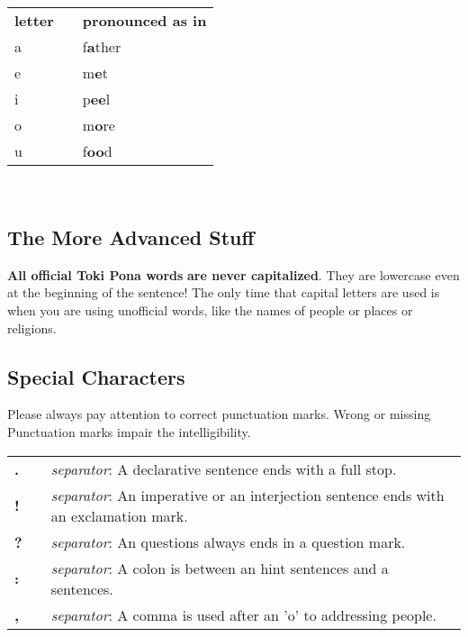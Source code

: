 \begin{supertabular}{p{2,5cm}|ll}
\textbf{letter}   &&    \textbf{pronounced as in} \\ %
a   &&    f\textbf{a}ther \\ %
e   &&    m\textbf{e}t \\ %
i   &&    p\textbf{ee}l \\ %
o   &&    m\textbf{o}re \\ %
u   &&    f\textbf{oo}d \\ %
\end{supertabular} \\
%
\subsection*{The More Advanced Stuff}
%
\textbf{All official Toki Pona words} 
\textbf{are never capitalized}. They are lowercase even at the beginning of the sentence! 
The only time that capital letters are used is when you are using unofficial words, like the names of people or places or religions. 
%
%
\subsection*{Special Characters}
%
Please always pay attention to correct punctuation marks. Wrong or missing
Punctuation marks impair the intelligibility.

\begin{supertabular}{p{2,5cm}|ll}
\textbf{.} && \textit{separator}: A declarative sentence ends with a full stop. \\ %
\textbf{!} && \textit{separator}: An imperative or an interjection sentence ends with an exclamation mark. \\ %
\textbf{?} && \textit{separator}: An questions always ends in a question mark. \\ %
\textbf{:} && \textit{separator}: A colon is between an hint sentences and a sentences. \\  %
\textbf{,} && \textit{separator}: A comma is used after an 'o' to addressing people. \\ %
\end{supertabular} \\
%
